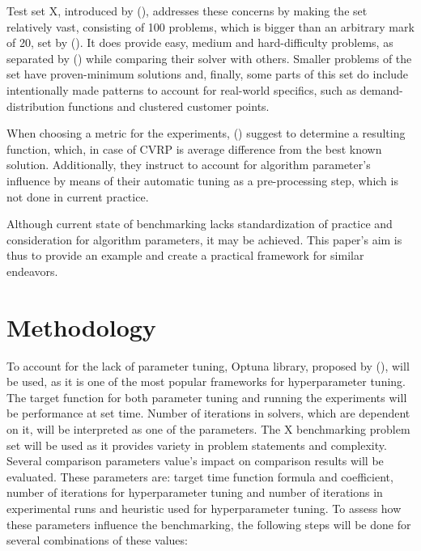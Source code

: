 \documentclass[a4paper,12pt]{report}
\begin{document}
{Test set X, introduced by  (\citeyear{uchoaNew}), addresses these concerns by making the set relatively vast, consisting of 100 problems, which is bigger than an arbitrary mark of 20, set by  (\citeyear{beiranvandBest}). It does provide easy, medium and hard-difficulty problems, as separated by  (\citeyear{christiaensSlackInductionString2020}) while comparing their solver with others. Smaller problems of the set have proven-minimum solutions and, finally, some parts of this set do include intentionally made patterns to account for real-world specifics, such as demand-distribution functions and clustered customer points.

When choosing a metric for the experiments,  (\citeyear{beiranvandBest}) suggest to determine a resulting function, which, in case of CVRP is average difference from the best known solution. Additionally, they instruct to account for algorithm parameter's influence by means of their automatic tuning as a pre-processing step, which is not done in current practice.

Although current state of benchmarking lacks standardization of practice and consideration for algorithm parameters, it may be achieved. This paper's aim is thus to provide an example and create a practical framework for similar endeavors.

\section{Methodology}

To account for the lack of parameter tuning, Optuna library, proposed by  (\citeyear{akibaOptuna}), will be used, as it is one of the most popular frameworks for hyperparameter tuning. The target function for both parameter tuning and running the experiments will be performance at set time. Number of iterations in solvers, which are dependent on it, will be interpreted as one of the parameters.
The X benchmarking problem set will be used as it provides variety in problem statements and complexity.
Several comparison parameters value's impact on comparison results will be evaluated. These parameters are: target time function formula and coefficient, number of iterations for hyperparameter tuning and number of iterations in experimental runs and heuristic used for hyperparameter tuning.
To assess how these parameters influence the benchmarking, the following steps will be done for several combinations of these values:

}
\end{document}
